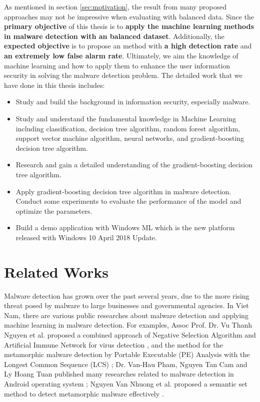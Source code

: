 As mentioned in section \ref{sec:motivation}, the result from many proposed approaches may not be impressive when evaluating with balanced data. Since the \textbf{primary objective} of this thesis is to \textbf{apply the machine learning methods in malware detection with an balanced dataset}. Additionally, the \textbf{expected objective} is to propose an method with \textbf{a high detection rate} and \textbf{an extremely low false alarm rate}. Ultimately, we aim the knowledge of machine learning and how to apply them to enhance the user information security in solving the malware detection problem. The detailed work that  we have done in this thesis includes:
\begin{itemize}
\item Study and build the background in information security, especially malware.
\item Study and understand the fundamental knowledge in Machine  Learning including classification, decision tree algorithm, random forest algorithm, support vector machine algorithm, neural networks, and gradient-boosting decision tree algorithm. 
\item Research and gain a detailed understanding of the gradient-boosting decision tree algorithm.
\item Apply gradient-boosting decision tree algorithm in malware detection. Conduct some experiments to evaluate the performance of the model and optimize the parameters.
\item Build a demo application with Windows ML which is the new platform released with Windows 10 April 2018 Update.
\end{itemize}

\section{Related Works}

Malware detection has grown over the past several years, due to the more rising threat posed by malware to large businesses and governmental agencies. In Viet Nam, there are various public researches about malware detection and applying machine learning in malware detection. For examples, Assoc Prof. Dr. Vu Thanh Nguyen et al. proposed a combined approach of Negative Selection Algorithm and Artificial Immune Network for virus detection \cite{nguyen2014combination}, and the method for the metamorphic malware detection by Portable Executable (PE) Analysis with the Longest Common Sequence (LCS) \cite{vu2017metamorphic}; Dr. Van-Hau Pham, Nguyen Tan Cam and Ly Hoang Tuan published many researches related to malware detection in Android operating system \cite{pham2017eddleak, cam2017sensitive, tuan2017enhancing}; Nguyen Van Nhuong et al. proposed a semantic set method to detect metamorphic malware effectively \cite{van2014semantic}.

